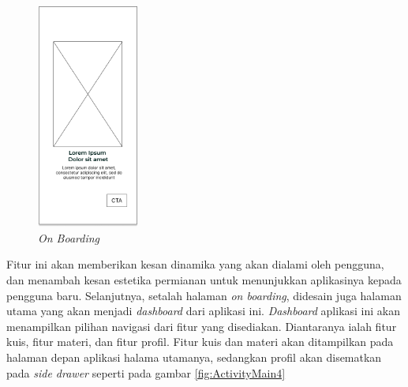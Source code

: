 \begin{figure}[H]
	\centering
	\includegraphics[width=0.3\textwidth]{contents/chapter-3/images/MF-Boarding.png}
	\caption{\textit{On Boarding}}
	\label{Fig:OnBoarding}
\end{figure}
\newpage
Fitur ini akan memberikan kesan dinamika yang akan dialami oleh pengguna, dan menambah kesan estetika permianan untuk menunjukkan aplikasinya kepada pengguna baru.
Selanjutnya, setalah halaman \textit{on boarding}, didesain juga halaman utama yang akan menjadi \textit{dashboard} dari aplikasi ini.
\textit{Dashboard} aplikasi ini akan menampilkan pilihan navigasi dari fitur yang disediakan. Diantaranya ialah fitur kuis, fitur materi, dan fitur profil. 
Fitur kuis dan materi akan ditampilkan pada halaman depan aplikasi halama utamanya, sedangkan profil akan disematkan pada \textit{side drawer} seperti pada gambar \ref*{fig:ActivityMain4}
